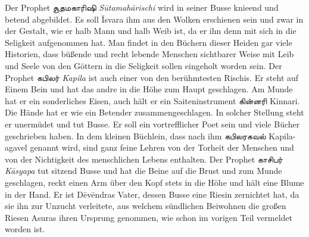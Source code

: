 \documentclass{article}
\newcommand{\TamilText}[1]{\texttamil{#1}}
\newcommand{\tam}[1]{\TamilText{#1}}
\begin{document}
Der Prophet \tam{சூதமகாரிஷி} \emph{S\={u}tamah\={a}rischi} wird in seiner Busse knieend und betend abgebildet. Es soll \={I}svara ihm aus den Wolken erschienen sein und zwar in der Gestalt, wie er halb Mann und halb Weib ist, da er ihn denn mit sich in die Seligkeit aufgenommen hat. Man findet in den Büchern dieser Heiden gar viele Historien, dass büßende und recht lebende Menschen sichtbarer Weise mit Leib und Seele von den Göttern in die Seligkeit sollen eingeholt worden sein. Der Prophet \tam{கபிலர்} \emph{Kapila} ist auch einer von den berühmtesten Rischis. Er steht auf Einem Bein und hat das andre in die Höhe zum Haupt geschlagen. Am Munde hat er ein sonderliches Eisen, auch hält er ein Saiteninstrument \tam{கின்னரி} Kinnari. Die Hände hat er wie ein Betender zusammengeschlagen. In solcher Stellung steht er unermüdet und tut Busse. Er soll ein vortrefflicher Poet sein und viele Bücher geschrieben haben. In dem kleinen Büchlein, dass nach ihm \tam{கபிலரகவல்} Kapila-agavel genannt wird, sind ganz feine Lehren von der Torheit der Menschen und von der Nichtigkeit des menschlichen Lebens enthalten. Der Prophet \tam{காசிபர்} \emph{K\={a}syapa} tut sitzend Busse und hat die Beine auf die Brust und zum Munde geschlagen, reckt einen Arm über den Kopf stets in die Höhe und hält eine Blume in der Hand. Er ist D\={e}v\={e}ndras Vater, dessen Busse eine Riesin zernichtet hat, da sie ihn zur Unzucht verleitete, aus welchem sündlichen Beiwohnen die großen Riesen Asuras ihren Ursprung genommen, wie schon im vorigen Teil vermeldet worden ist.
\end{document}
